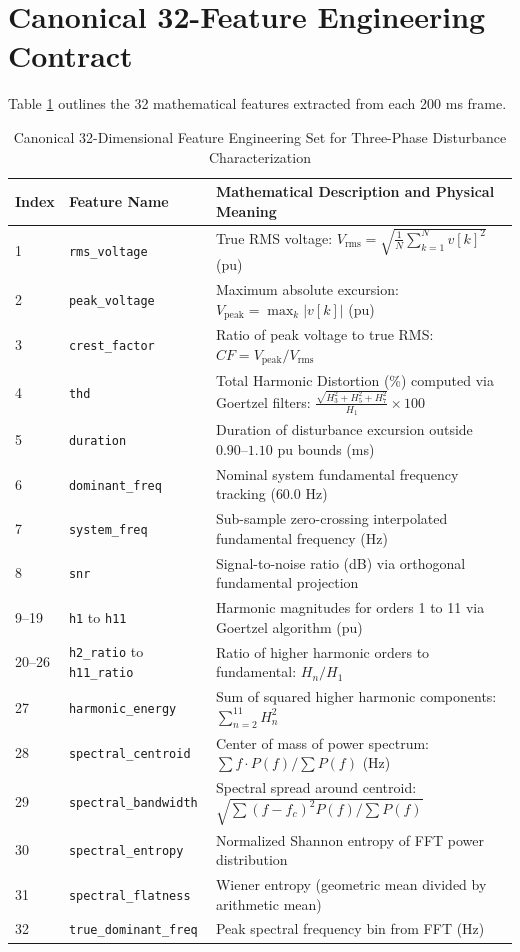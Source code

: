 \documentclass[12pt,a4paper]{report}
\begin{document}
\section{Canonical 32-Feature Engineering Contract}
Table \ref{tab:32_features} outlines the 32 mathematical features extracted from each 200 ms frame.

\begin{table}[H]
\centering
\caption{Canonical 32-Dimensional Feature Engineering Set for Three-Phase Disturbance Characterization}
\label{tab:32_features}
\small
\begin{tabularx}{\textwidth}{llX}
\toprule
\textbf{Index} & \textbf{Feature Name} & \textbf{Mathematical Description and Physical Meaning} \\
\midrule
1 & \texttt{rms\_voltage} & True RMS voltage: $V_{\text{rms}} = \sqrt{\frac{1}{N}\sum_{k=1}^N v[k]^2}$ (pu) \\
2 & \texttt{peak\_voltage} & Maximum absolute excursion: $V_{\text{peak}} = \max_k |v[k]|$ (pu) \\
3 & \texttt{crest\_factor} & Ratio of peak voltage to true RMS: $CF = V_{\text{peak}} / V_{\text{rms}}$ \\
4 & \texttt{thd} & Total Harmonic Distortion (\%) computed via Goertzel filters: $\frac{\sqrt{H_3^2+H_5^2+H_7^2}}{H_1} \times 100$ \\
5 & \texttt{duration} & Duration of disturbance excursion outside $0.90\text{--}1.10\text{ pu}$ bounds (ms) \\
6 & \texttt{dominant\_freq} & Nominal system fundamental frequency tracking ($60.0\text{ Hz}$) \\
7 & \texttt{system\_freq} & Sub-sample zero-crossing interpolated fundamental frequency (Hz) \\
8 & \texttt{snr} & Signal-to-noise ratio (dB) via orthogonal fundamental projection \\
9--19 & \texttt{h1} to \texttt{h11} & Harmonic magnitudes for orders 1 to 11 via Goertzel algorithm (pu) \\
20--26 & \texttt{h2\_ratio} to \texttt{h11\_ratio} & Ratio of higher harmonic orders to fundamental: $H_n / H_1$ \\
27 & \texttt{harmonic\_energy} & Sum of squared higher harmonic components: $\sum_{n=2}^{11} H_n^2$ \\
28 & \texttt{spectral\_centroid} & Center of mass of power spectrum: $\sum f \cdot P(f) / \sum P(f)$ (Hz) \\
29 & \texttt{spectral\_bandwidth} & Spectral spread around centroid: $\sqrt{\sum (f - f_c)^2 P(f) / \sum P(f)}$ \\
30 & \texttt{spectral\_entropy} & Normalized Shannon entropy of FFT power distribution \\
31 & \texttt{spectral\_flatness} & Wiener entropy (geometric mean divided by arithmetic mean) \\
32 & \texttt{true\_dominant\_freq} & Peak spectral frequency bin from FFT (Hz) \\
\bottomrule
\end{tabularx}
\end{table}
\end{document}
